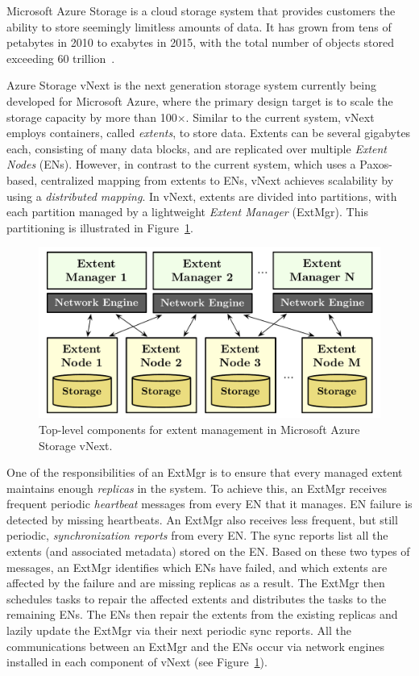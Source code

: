 Microsoft Azure Storage is a cloud storage system that provides customers the ability to store seemingly limitless amounts of data. It has grown from tens of petabytes in 2010 to exabytes in 2015, with the total number of objects stored exceeding 60 trillion~\cite{greenberg2015keynote}.

Azure Storage vNext is the next generation storage system currently being developed for Microsoft Azure, where the primary design target is to scale the storage capacity by more than 100$\times$. Similar to the current system, vNext employs containers, called \emph{extents}, to store data. Extents can be several gigabytes each, consisting of many data blocks, and are replicated over multiple \emph{Extent Nodes} (ENs). However, in contrast to the current system, which uses a Paxos-based, centralized mapping from extents to ENs, vNext achieves scalability by using a \emph{distributed mapping}. In vNext, extents are divided into partitions, with each partition managed by a lightweight \emph{Extent Manager} (ExtMgr). This partitioning is illustrated in Figure~\ref{fig:vnext}.

\begin{figure}[t]
\centering
\includegraphics[width=\linewidth]{img/azurestore}
\vspace{-6mm}
\caption{Top-level components for extent management in Microsoft Azure Storage vNext.}
\label{fig:vnext}
\vspace{-2mm}
\end{figure}

One of the responsibilities of an ExtMgr is to ensure that every managed extent maintains enough \emph{replicas} in the system. To achieve this, an ExtMgr receives frequent periodic \emph{heartbeat} messages from every EN that it manages. EN failure is detected by missing heartbeats. An ExtMgr also receives less frequent, but still periodic, \emph{synchronization reports} from every EN. The sync reports list all the extents (and associated metadata) stored on the EN. Based on these two types of messages, an ExtMgr identifies which ENs have failed, and which extents are affected by the failure and are missing replicas as a result. The ExtMgr then schedules tasks to repair the affected extents and distributes the tasks to the remaining ENs. The ENs then repair the extents from the existing replicas and lazily update the ExtMgr via their next periodic sync reports. All the communications between an ExtMgr and the ENs occur via network engines installed in each component of vNext (see Figure~\ref{fig:vnext}).

